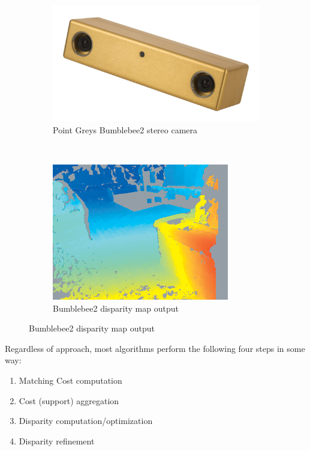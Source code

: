 \begin{figure}
  \centering
  \begin{subfigure}[b]{0.4\textwidth}
    \includegraphics[width=\textwidth]{images/bumblebee2.jpg}
    \caption{Point Greys Bumblebee2 stereo camera}
  \end{subfigure}
  ~
  \begin{subfigure}[b]{0.4\textwidth}
    \includegraphics[width=\textwidth]{images/bumblebee_output.png}
    \caption{Bumblebee2 disparity map output}
  \end{subfigure}
\end{figure}


Regardless of approach, most algorithms perform the following four
steps in some way\cite{taxonomy}:

\begin{enumerate}
\item Matching Cost computation
\item Cost (support) aggregation
\item Disparity computation/optimization
\item Disparity refinement
\end{enumerate}

